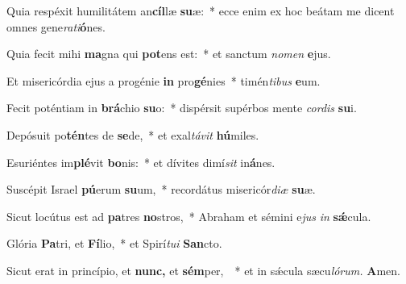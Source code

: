\item Quia respéxit humilitátem an\textbf{cíl}læ \textbf{su}æ:~* ecce enim ex hoc beátam me dicent omnes gene\textit{rati}\textbf{ó}nes.
\item Quia fecit mihi \textbf{ma}gna qui \textbf{pot}ens est:~* et sanctum \textit{nomen} \textbf{e}jus.
\item Et misericórdia ejus a progénie \textbf{in} pro\textbf{gé}nies~* timén\textit{tibus} \textbf{e}um.
\item Fecit poténtiam in \textbf{brá}chio \textbf{su}o:~* dispérsit supérbos mente \textit{cordis} \textbf{su}i.
\item Depósuit po\textbf{tén}tes de \textbf{se}de,~* et exal\textit{távit} \textbf{hú}miles.
\item Esuriéntes im\textbf{plé}vit \textbf{bo}nis:~* et dívites dimí\hspace*{0.02em}\textit{sit} in\textbf{á}nes.
\item Suscépit Israel \textbf{pú}erum \textbf{su}um,~* recordátus misericór\textit{diæ} \textbf{su}æ.
\item Sicut locútus est ad \textbf{pa}tres \textbf{no}stros,~* Abraham et sémini e\hspace*{0.02em}\textit{jus} \textit{in} \textbf{sǽ}cula.
\item Glória \textbf{Pa}tri, et \textbf{Fí}lio,~* et Spirí\tinyhspace\textit{tui} \textbf{San}cto.
\item Sicut erat in princípio, et \textbf{nunc,} et \textbf{sém}per, ~* et in sǽcula sæcu\tinyhspace\textit{lórum.} \textbf{A}men.